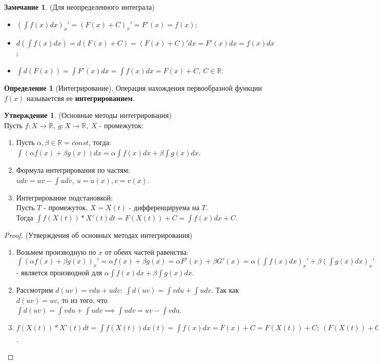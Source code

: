 \documentclass{article}
\theoremstyle{definition}
\newtheorem{definition}{Определение}[section]
\newtheorem{statement}{Утверждение}[section]
\newtheorem*{remark}{Замечание}
\begin{document}
\begin{remark}
  (Для неопределенного интеграла)
  \begin{itemize}
    \item \((\int f(x) dx)_{x}' = (F(x) + C)_{x}' = F'(x) = f(x)\);
    \item \(d(\int f(x) dx) = d(F(x) + C) = (F(x) + C)' dx = F'(x) dx = f(x) dx\);
    \item \(\int d(F(x)) = \int F'(x) dx = \int f(x) dx = F(x) + C, \ C \in \mathbb{R}\). 
  \end{itemize}
\end{remark}

\begin{definition}[Интегрирование]
  Операция нахождения первообразной функции \(f(x)\) называетсвя ее \textbf{интегрированием}.
\end{definition}

\begin{statement}
  (Основные методы интегрирования) \\
  Пусть \(f: X \rightarrow \mathbb{R}, \ g:X \rightarrow \mathbb{R}, \ X\) - промежуток:
  \begin{enumerate}
    \item Пусть \(\alpha, \beta \in \mathbb{R} = const\), тогда:\\
      \(\int (\alpha f(x) + \beta g(x)) dx = \alpha \int f(x) dx + \beta \int g(x) dx\).
    \item Формула интегрирования по частям: \\
      \(udv = uv - \int udv, \ u = u(x), v = v(x)\).
    \item Интегрирование подстановкой: \\
      Пусть \(T\) - промежуток, \(X = X(t)\) - дифференцируема на \(T\). \\
      Тогда \(\int f(X(t)) * X'(t) dt = F(X(t)) + C = \int f(x) dx + C\).
  \end{enumerate}
\end{statement}

\begin{proof}
  (Утверждения об основных методах интегрирования)
  \begin{enumerate}
    \item Возьмем производную по \(x\) от обеих частей равенства: \(\int(\alpha f(x) +
      \beta g(x))_{x}' = \alpha f(x) + \beta g(x) = \alpha F'(x) + \beta G'(x) =
      \alpha(\int f(x) dx)_{x}' + \beta(\int g(x) dx)_{x}'\) - является производной для
      \(\alpha \int f(x) dx + \beta \int g(x) dx\).
    \item Рассмотрим \(d(uv) = v du + u dv: \ \int d(uv) = \int v du + \int u dv\).
      Так как \(d(uv) = uv\), то из того, что \(\int d(uv) = \int v du + \int u dv
      \implies \int u dv = uv - \int v du\).
    \item \(f(X(t)) * X'(t) dt = \int f(X(t)) dx(t) = \int f(x) dx = F(x) + C =
      F(X(t)) + C; \ (F(X(t)) + C)_{t}' = F_{t}' * X_{t}' = f(x) * X'(t) =
      (\int f(X(t)) * X'(t) dt)_{t}'\).
  \end{enumerate}
\end{proof}
\end{document}
